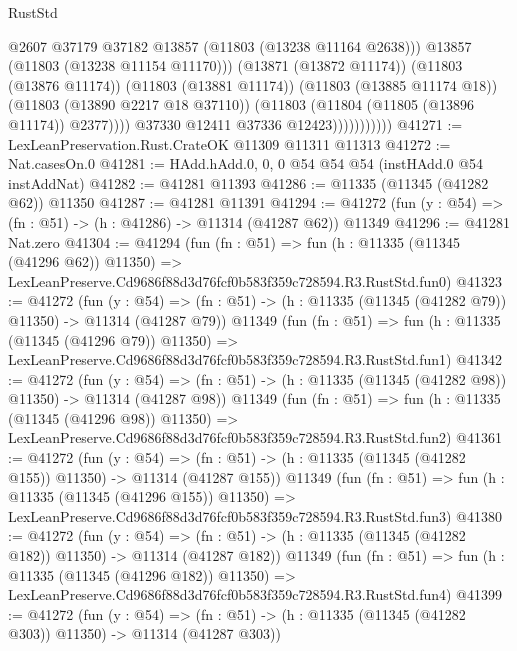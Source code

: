 \begin{lexlean}{RustStd}
\begin{coremodule}
                                  @2607
                                  @37179
                                  @37182
                                  @13857
                                  (@11803 (@13238 @11164 @2638)))
                                @13857
                                (@11803 (@13238 @11154 @11170)))
                              (@13871 (@13872 @11174))
                              (@11803 (@13876 @11174))
                              (@11803 (@13881 @11174))
                              (@11803 (@13885 @11174 @18))
                              (@11803 (@13890 @2217 @18 @37110))
                              (@11803 (@11804 (@11805 (@13896 @11174)) @2377))))
                          @37330
                          @12411
                          @37336
                          @12423)))))))))))
@41271 := LexLeanPreservation.Rust.CrateOK @11309 @11311 @11313
@41272 := Nat.casesOn.{0}
@41281 := HAdd.hAdd.{0, 0, 0} @54 @54 @54 (instHAdd.{0} @54 instAddNat)
@41282 := @41281 @11393
@41286 := @11335 (@11345 (@41282 @62)) @11350
@41287 := @41281 @11391
@41294 := @41272 (fun (y : @54) => (fn : @51) -> (h : @41286) -> @11314 (@41287 @62)) @11349
@41296 := @41281 Nat.zero
@41304 := @41294
    (fun (fn : @51) =>
    fun (h : @11335 (@11345 (@41296 @62)) @11350) =>
    LexLeanPreserve.Cd9686f88d3d76fcf0b583f359c728594.R3.RustStd.fun0)
@41323 := @41272
    (fun (y : @54) =>
    (fn : @51) -> (h : @11335 (@11345 (@41282 @79)) @11350) -> @11314 (@41287 @79))
    @11349
    (fun (fn : @51) =>
    fun (h : @11335 (@11345 (@41296 @79)) @11350) =>
    LexLeanPreserve.Cd9686f88d3d76fcf0b583f359c728594.R3.RustStd.fun1)
@41342 := @41272
    (fun (y : @54) =>
    (fn : @51) -> (h : @11335 (@11345 (@41282 @98)) @11350) -> @11314 (@41287 @98))
    @11349
    (fun (fn : @51) =>
    fun (h : @11335 (@11345 (@41296 @98)) @11350) =>
    LexLeanPreserve.Cd9686f88d3d76fcf0b583f359c728594.R3.RustStd.fun2)
@41361 := @41272
    (fun (y : @54) =>
    (fn : @51) -> (h : @11335 (@11345 (@41282 @155)) @11350) -> @11314 (@41287 @155))
    @11349
    (fun (fn : @51) =>
    fun (h : @11335 (@11345 (@41296 @155)) @11350) =>
    LexLeanPreserve.Cd9686f88d3d76fcf0b583f359c728594.R3.RustStd.fun3)
@41380 := @41272
    (fun (y : @54) =>
    (fn : @51) -> (h : @11335 (@11345 (@41282 @182)) @11350) -> @11314 (@41287 @182))
    @11349
    (fun (fn : @51) =>
    fun (h : @11335 (@11345 (@41296 @182)) @11350) =>
    LexLeanPreserve.Cd9686f88d3d76fcf0b583f359c728594.R3.RustStd.fun4)
@41399 := @41272
    (fun (y : @54) =>
    (fn : @51) -> (h : @11335 (@11345 (@41282 @303)) @11350) -> @11314 (@41287 @303))

\end{coremodule}
\end{lexlean}

